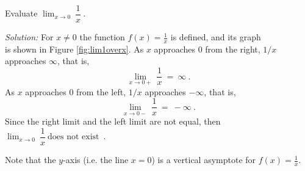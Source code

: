\begin{exmp}\label{exmp:lim1overx}
 \piccaption[]{\label{fig:lim1overx}}
\noindent Evaluate $\displaystyle\lim_{x \to 0}~\dfrac{1}{x}~$.\vspace{1mm}
\par\noindent\emph{Solution:} For $x \ne 0$ the function $f(x) = \frac{1}{x}$
is defined, and its graph\\is shown in Figure \ref{fig:lim1overx}. As $x$
approaches $0$ from the right, $1/x$\\approaches $\infty$, that is,
\[
\lim_{x \to 0+}~\dfrac{1}{x} ~=~ \infty ~.
\]
As $x$ approaches $0$ from the left, $1/x$ approaches $-\infty$, that is,
\[
\lim_{x \to 0-}~\dfrac{1}{x} ~=~ -\infty ~.
\]
Since the right limit and the left limit are not equal, then
$\displaystyle\lim_{x \to 0}~\dfrac{1}{x} ~\text{does not exist}$~.

\noindent Note that the $y$-axis (i.e. the line $x = 0$) is a vertical asymptote
for $f(x) = \frac{1}{x}$.
\end{exmp}
\divider
\newpage

